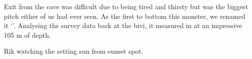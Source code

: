 Exit from the cave was difficult due to being tired and thirsty but   was the biggest pitch either of us had ever seen. As the first to bottom
this monster, we renamed it `'. Analysing the survey data back at the bivi, it measured in at an
impressive 105 m of depth.


\begin{pagefigure}
      \checkoddpage \ifoddpage \forcerectofloat \else \forceversofloat \fi
      \centering
  \caption{Rik watching the setting sun from sunset spot. }
\end{pagefigure}
